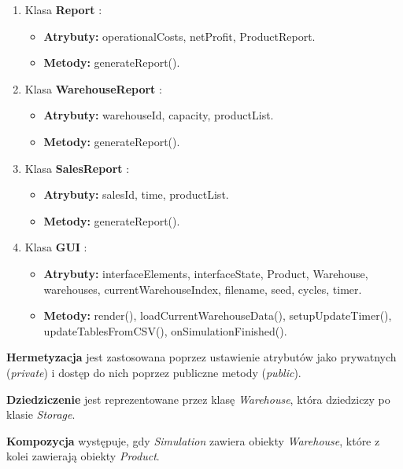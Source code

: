 \documentclass[11pt]{article}
\begin{document}
\begin{enumerate}
    \item Klasa \textbf{Report} :
    \begin{itemize}
        \item \textbf{Atrybuty:} operationalCosts, netProfit, ProductReport.
        \item \textbf{Metody:} generateReport().
    \end{itemize}

    \item Klasa \textbf{WarehouseReport} :
    \begin{itemize}
        \item \textbf{Atrybuty:} warehouseId, capacity, productList.
        \item \textbf{Metody:} generateReport().
    \end{itemize}

    \item Klasa \textbf{SalesReport} :
    \begin{itemize}
        \item \textbf{Atrybuty:} salesId, time, productList.
        \item \textbf{Metody:} generateReport().
    \end{itemize}

\item Klasa \textbf{GUI} :
    \begin{itemize}
        \item \textbf{Atrybuty:} interfaceElements, interfaceState, Product, Warehouse, warehouses, currentWarehouseIndex,
        filename, seed, cycles, timer.
        \item \textbf{Metody:} render(), loadCurrentWarehouseData(), setupUpdateTimer(), updateTablesFromCSV(),
        onSimulationFinished().
    \end{itemize}
    
\end{enumerate}


\textbf{Hermetyzacja} jest zastosowana poprzez ustawienie atrybutów jako prywatnych (\textit{private}) i dostęp do nich poprzez publiczne metody (\textit{public}).
\vspace{1pt}

\textbf{Dziedziczenie} jest reprezentowane przez klasę \textit{Warehouse}, która dziedziczy po klasie \textit{Storage}.
\vspace{1pt}

\textbf{Kompozycja} występuje, gdy \textit{Simulation} zawiera obiekty \textit{Warehouse}, które z kolei zawierają obiekty \textit{Product}.
\vspace{1pt}
\end{document}
